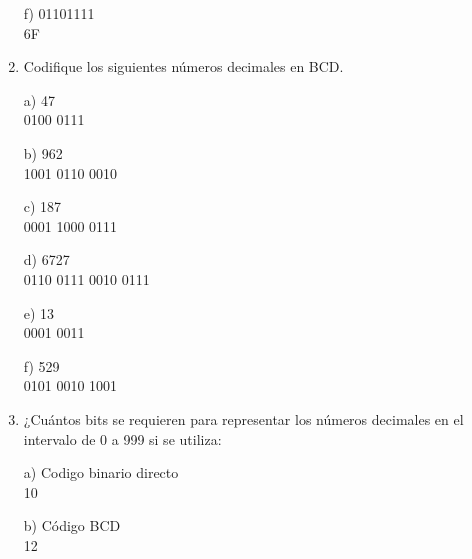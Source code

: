 \documentclass[a4paper, 12pt]{article}
\newcommand{\Aspace}{0.2cm}
\begin{document}
\begin{enumerate}
            \vspace{\Aspace} \par
            f) 01101111
            \\ { \color{azul} 6F }


        \item Codifique los siguientes números decimales en BCD.
            \vspace{\Aspace} \par
            a) 47
            \\ { \color{azul} 0100 0111 }

            \vspace{\Aspace} \par
            b) 962
            \\ { \color{azul} 1001 0110 0010 }

            \vspace{\Aspace} \par
            c) 187
            \\ { \color{azul} 0001 1000 0111 }

            \vspace{\Aspace} \par
            d) 6727
            \\ { \color{azul} 0110 0111 0010 0111 }

            \vspace{\Aspace} \par
            e) 13
            \\ { \color{azul} 0001 0011 }

            \vspace{\Aspace} \par
            f) 529
            \\ { \color{azul} 0101 0010 1001 }


        \item ¿Cuántos bits se requieren para representar los números decimales en el intervalo de 0 a 999 si se utiliza:
            \vspace{\Aspace} \par
            a) Codigo binario directo
            \\ { \color{azul} 10 }

            \vspace{\Aspace} \par
            b) Código BCD
            \\ { \color{azul} 12 }


\end{enumerate}
\end{document}
